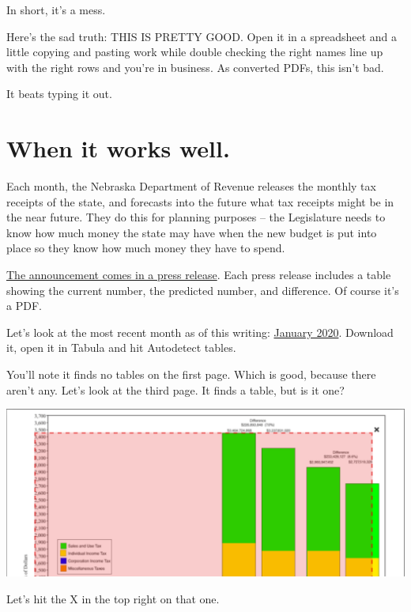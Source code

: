\documentclass[]{book}
\begin{document}
In short, it's a mess.

Here's the sad truth: THIS IS PRETTY GOOD. Open it in a spreadsheet and a little copying and pasting work while double checking the right names line up with the right rows and you're in business. As converted PDFs, this isn't bad.

It beats typing it out.

\hypertarget{when-it-works-well.}{%
\section{When it works well.}\label{when-it-works-well.}}

Each month, the Nebraska Department of Revenue releases the monthly tax receipts of the state, and forecasts into the future what tax receipts might be in the near future. They do this for planning purposes -- the Legislature needs to know how much money the state may have when the new budget is put into place so they know how much money they have to spend.

\href{https://revenue.nebraska.gov/about/news-releases/previous-general-funds-receipts-news-releases}{The announcement comes in a press release}. Each press release includes a table showing the current number, the predicted number, and difference. Of course it's a PDF.

Let's look at the most recent month as of this writing: \href{https://revenue.nebraska.gov/sites/revenue.nebraska.gov/files/doc/news-release/gen-fund/2020/General_Fund_Receipts_January_2020.pdf}{January 2020}. Download it, open it in Tabula and hit Autodetect tables.

You'll note it finds no tables on the first page. Which is good, because there aren't any. Let's look at the third page. It finds a table, but is it one?

\includegraphics[width=29.06in]{images/pdfs5}

Let's hit the X in the top right on that one.
\end{document}
